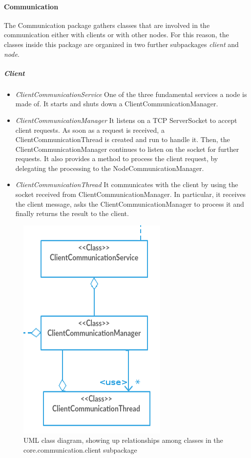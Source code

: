 \documentclass{article}
\begin{document}
\paragraph{Communication} The Communication package gathers classes that are involved in the communication either with clients or with other nodes. For this reason, the classes inside this package are organized in two further subpackages \textit{client} and \textit{node}. 
\subparagraph{Client} 
\begin{itemize}
\item \textit{ClientCommunicationService} One of the three fundamental services a node is made of. It starts and shuts down a ClientCommunicationManager.
\item \textit{ClientCommunicationManager} It listens on a TCP ServerSocket to accept client requests. As soon as a request is received, a ClientCommunicationThread is created and run to handle it. Then, the ClientCommunicationManager continues to listen on the socket for further requests. It also provides a method to process the client request, by delegating the processing to the NodeCommunicationManager.
\item \textit{ClientCommunicationThread} It communicates with the client by using the socket received from ClientCommunicationManager. In particular, it receives the client message, asks the ClientCommunicationManager to process it and finally returns the result to the client.
\end{itemize}
\begin{figure}[h]
\centering
\includegraphics[scale=0.40]{classes_client_subpackage}
\caption{UML class diagram, showing up relationships among classes in the core.communication.client subpackage}
\label{fig:class_diag_core.communication.client	}
\end{figure}
\end{document}
